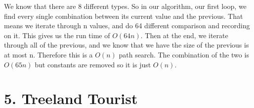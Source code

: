 \documentclass[11pt]{article}
\newenvironment{qparts}{\begin{enumerate}[{(}a{)}]}{\end{enumerate}}
\begin{document}
\begin{qparts}
\begin{qparts}
We know that there are 8 different types. So in our algorithm, our first loop, we find every single combination between its current value and the previous. That means we iterate through n values, and do 64 different comparison and recording on it. This gives us the run time of $O(64n)$. Then at the end, we iterate through all of the previous, and we know that we have the size of the previous is at most n. Therefore this is a $O(n)$ path search. The combination of the two is $O(65n)$ but constants are removed so it is just $O(n)$. 
\end{qparts}

\end{qparts}

\newpage
\section*{5. Treeland Tourist}
\end{document}
